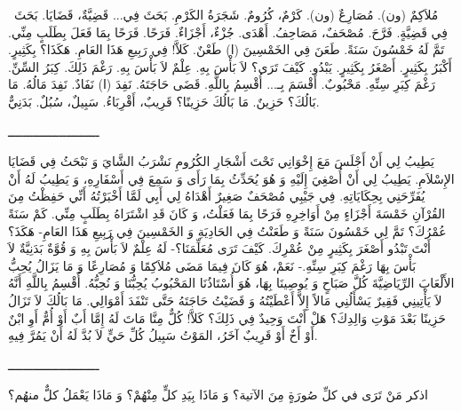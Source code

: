 \documentclass[a5paper]{article}
\begin{document}
\ مُلاَكِمٌ (ون). مُصَارِعٌ (ون). كَرْمٌ، كُرُومٌ. \newline
شَجَرَةُ الكَرْمِ. بَحَثَ فِي... قَضِيَّةٌ، قَضَايَا. بَحَثَ فِي قَضِيَّةٍ. فَرَّحَ. مُصْحَفٌ، مَصَاحِفُ. أَهْدَى. جُزْءٌ، أَجْزَاءٌ. فَرَحًا. فَرَحًا بِمَا فَعَلَ بِطَلَبٍ مِنِّي. تَمَّ لَهُ خَمْسُونَ سَنَةً. طَعَنَ فِي الخَمْسِينَ (ا) طَعْنٌ. كَلاَّ! فِي رَبِيعِ هَذَا العَامِ. هَكَذَا؟ بِكَثِيرٍ. أَكْبَرُ بِكَثِيرٍ. أَصْغَرُ بِكَثِيرٍ. يَبْدُو. كَيْفَ تَرَى؟ لاَ بَأْسَ بِهِ. عِلْمٌ لاَ بَأْسَ بِهِ. رَغْمَ ذَلِكَ. كِبَرُ السِّنِّ. رَغْمَ كِبَرِ سِنِّهِ. مَحْبُوبٌ. أَقْسَمَ بِـ... أُقْسِمُ بِاللَّهِ. قَضَى حَاجَتَهُ. نَفِدَ (ا) نَفَادٌ. نَفِدَ مَالُهُ. مَا بَالُكَ؟ حَزِينٌ. مَا بَالُكَ حَزِينًا؟ قَرِيبٌ، أَقْرِبَاءُ. سَبِيلٌ، سُبُلٌ. بَدَنِيٌّ.

ـــــــــــــــــــــــــ

يَطِيبُ لِي أَنْ أَجْلَسَ مَعَ إِخْوَانِي تَحْتَ أَشْجَارِ الكُرُومِ نَشْرَبُ الشَّايَ وَ نَبْحَثُ فِي قَضَايَا الإِسْلاَمِ. يَطِيبُ لِي أَنْ أُصْغِيَ إِلَيْهِ وَ هُوَ يُحَدِّثُ بِمَا رَأَى وَ سَمِعَ فِي أَسْفَارِهِ، وَ يَطِيبُ لَهُ أَنْ يُفَرِّحَنِي بِحِكَايَاتِهِ. فِي جَيْبِي مُصْحَفٌ صَغِيرٌ أَهْدَاهُ لِي أَبِي لَمَّا أَخْبَرْتُهُ أَنِّي حَفِظْتُ مِنَ القُرْآنِ خَمْسَةَ أَجْزَاءٍ مِنْ أَوَاخِرِهِ فَرَحًا بِمَا فَعَلْتُ، وَ كَانَ قَدِ اشْتَرَاهُ بِطَلَبٍ مِنِّي. كَمْ سَنَةً عُمْرُكَ؟ تَمَّ لِي خَمْسُونَ سَنَةً وَ طَعَنْتُ فِي الحَادِيَةِ وَ الخَمْسِينَ فِي رَبِيعِ هَذَا العَامِ- هَكَذَ؟ أَنْتَ تَبْدُو أَصْغَرَ بِكَثِيرٍ مِنْ عُمْرِكَ. كَيْفَ تَرَى مُعَلِّمَنَا؟- لَهُ عِلْمٌ لاَ بَأْسَ بِهِ وَ قُوَّةٌ بَدَنِيَّةٌ لاَ بَأْسَ بِهَا رَغْمَ كِبَرِ سِنِّهِ.- نَعَمْ، هُوَ كَانَ فِيمَا مَضَى مُلاَكِمًا وَ مُصَارِعًا وَ مَا يَزَالُ يُحِبُّ الأَلْعَابَ الرِّيَاضِيَّةَ كُلَّ صَبَاحٍ وَ يُوصِينَا بِهَا، هُوَ أُسْتَاذُنَا المَحْبُوبُ يُحِبُّنَا وَ نُحِبُّهُ. أُقْسِمُ بِاللَّهِ أَنَّهُ لاَ يَأْتِينِي فَقِيرٌ يَسْأَلُنِي مَالاً إِلاَّ أَعْطَيْتُهُ وَ قَضَيْتُ حَاجَتَهُ حَتَّى تَنْفَدَ أَمْوَالِي. مَا بَالُكَ لاَ تَزَالُ حَزِينًا بَعْدَ مَوْتِ وَالِدِكَ؟ هَلْ أَنْتَ وَحِيدٌ فِي ذَلِكَ؟ كَلاَّ! كُلٌّ مِنَّا مَاتَ لَهُ إِمَّا أَبٌ أَوْ أُمٌّ أَوِ ابْنٌ أَوْ أَخٌ أَوْ قَرِيبٌ آخَرُ، المَوْتُ سَبِيلُ كُلِّ حَيٍّ لاَ بُدَّ لَهُ أَنْ يَمُرَّ فِيهِ.

ـــــــــــــــــــــــــ

اذكر مَنْ تَرَى في كلِّ صُورَةٍ مِنَ الآتية؟ وَ مَاذَا بِيَدِ كلٍّ مِنْهُمْ؟ وَ مَاذَا يَعْمَلُ كلٌّ منهُم؟
\end{document}
